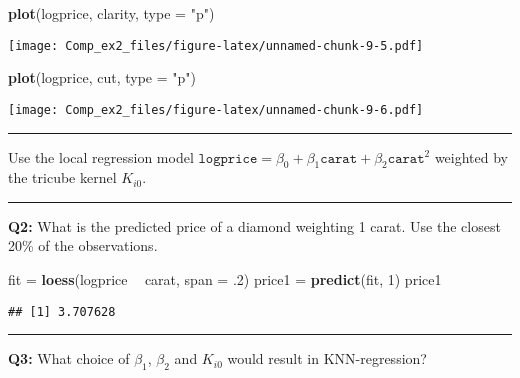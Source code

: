 \documentclass[]{article}
\newenvironment{Shaded}{\begin{snugshade}}{\end{snugshade}}
\newcommand{\KeywordTok}[1]{\textcolor[rgb]{0.13,0.29,0.53}{\textbf{#1}}}
\newcommand{\DataTypeTok}[1]{\textcolor[rgb]{0.13,0.29,0.53}{#1}}
\newcommand{\DecValTok}[1]{\textcolor[rgb]{0.00,0.00,0.81}{#1}}
\newcommand{\StringTok}[1]{\textcolor[rgb]{0.31,0.60,0.02}{#1}}
\newcommand{\OperatorTok}[1]{\textcolor[rgb]{0.81,0.36,0.00}{\textbf{#1}}}
\newcommand{\NormalTok}[1]{#1}
\begin{document}
\begin{Shaded}
\begin{Highlighting}[]
\KeywordTok{plot}\NormalTok{(logprice, clarity, }\DataTypeTok{type =} \StringTok{"p"}\NormalTok{)}
\end{Highlighting}
\end{Shaded}

\texttt{[image: Comp\_ex2\_files/figure-latex/unnamed-chunk-9-5.pdf]}

\begin{Shaded}
\begin{Highlighting}[]
\KeywordTok{plot}\NormalTok{(logprice, cut, }\DataTypeTok{type =} \StringTok{"p"}\NormalTok{)}
\end{Highlighting}
\end{Shaded}

\texttt{[image: Comp\_ex2\_files/figure-latex/unnamed-chunk-9-6.pdf]}

\begin{center}\rule{0.5\linewidth}{\linethickness}\end{center}

Use the local regression model
\(\texttt{logprice} = \beta_0 + \beta_1 \texttt{carat}+ \beta_2 \texttt{carat}^2\)
weighted by the tricube kernel \(K_{i0}\).

\begin{center}\rule{0.5\linewidth}{\linethickness}\end{center}

\textbf{Q2:} What is the predicted price of a diamond weighting 1 carat.
Use the closest 20\% of the observations.

\begin{Shaded}
\begin{Highlighting}[]
\NormalTok{fit =}\StringTok{ }\KeywordTok{loess}\NormalTok{(logprice }\OperatorTok{~}\StringTok{ }\NormalTok{carat, }\DataTypeTok{span =}\NormalTok{ .}\DecValTok{2}\NormalTok{)}
\NormalTok{price1 =}\StringTok{ }\KeywordTok{predict}\NormalTok{(fit, }\DecValTok{1}\NormalTok{)}
\NormalTok{price1}
\end{Highlighting}
\end{Shaded}

\begin{verbatim}
## [1] 3.707628
\end{verbatim}

\begin{center}\rule{0.5\linewidth}{\linethickness}\end{center}

\textbf{Q3:} What choice of \(\beta_1\), \(\beta_2\) and \(K_{i0}\)
would result in KNN-regression?
\end{document}
